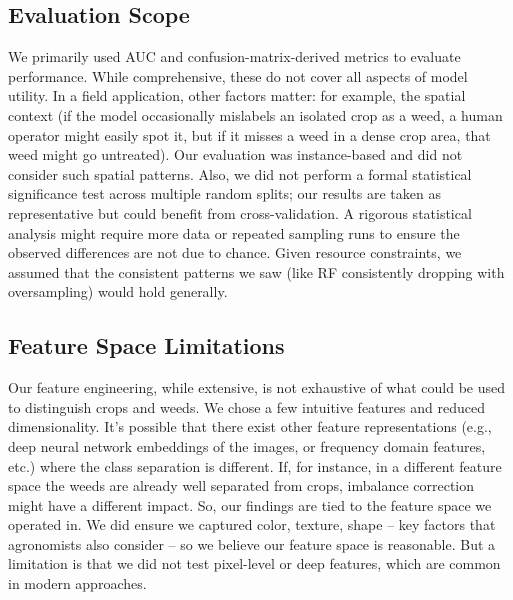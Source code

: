 \documentclass[agriengineering,article,submit,pdftex,moreauthors]{Definitions/mdpi}
\begin{document}
\subsection{Evaluation Scope}
We primarily used AUC and confusion-matrix-derived metrics to evaluate performance. While comprehensive, these do not cover all aspects of model utility. In a field application, other factors matter: for example, the spatial context (if the model occasionally mislabels an isolated crop as a weed, a human operator might easily spot it, but if it misses a weed in a dense crop area, that weed might go untreated). Our evaluation was instance-based and did not consider such spatial patterns. Also, we did not perform a formal statistical significance test across multiple random splits; our results are taken as representative but could benefit from cross-validation. A rigorous statistical analysis might require more data or repeated sampling runs to ensure the observed differences are not due to chance. Given resource constraints, we assumed that the consistent patterns we saw (like RF consistently dropping with oversampling) would hold generally.

\subsection{Feature Space Limitations}
Our feature engineering, while extensive, is not exhaustive of what could be used to distinguish crops and weeds. We chose a few intuitive features and reduced dimensionality. It’s possible that there exist other feature representations (e.g., deep neural network embeddings of the images, or frequency domain features, etc.) where the class separation is different. If, for instance, in a different feature space the weeds are already well separated from crops, imbalance correction might have a different impact. So, our findings are tied to the feature space we operated in. We did ensure we captured color, texture, shape – key factors that agronomists also consider – so we believe our feature space is reasonable. But a limitation is that we did not test pixel-level or deep features, which are common in modern approaches.
\end{document}
